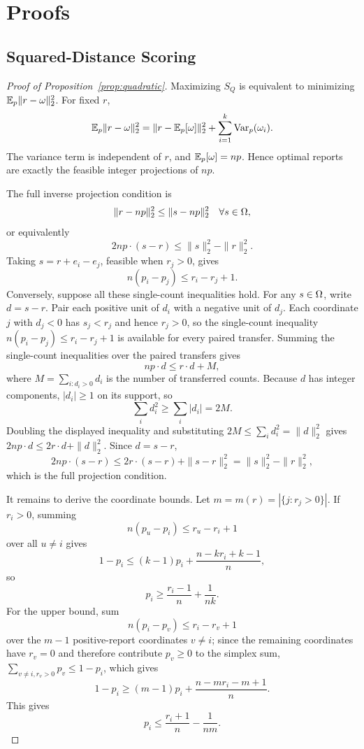 \appendix

\section{Proofs}

\subsection{Squared-Distance Scoring}
\label{app:squared-proof}

\begin{proof}[Proof of Proposition~\ref{prop:quadratic}]
Maximizing \(S_Q\) is equivalent to minimizing \(\mathbb{E}_p\|r-\omega\|_2^2\).
For fixed \(r\),
\[
\mathbb{E}_p\|r-\omega\|_2^2
=
\|r-\mathbb{E}_p[\omega]\|_2^2
+
\sum_{i=1}^k\mathrm{Var}_p(\omega_i).
\]
The variance term is independent of \(r\), and \(\mathbb{E}_p[\omega]=np\).
Hence optimal reports are exactly the feasible integer projections of \(np\).

The full inverse projection condition is
\[
\|r-np\|_2^2\le \|s-np\|_2^2
\quad
\forall s\in\Omega,
\]
or equivalently
\[
2np\cdot(s-r)\le \|s\|_2^2-\|r\|_2^2.
\]
Taking \(s=r+e_i-e_j\), feasible when \(r_j>0\), gives
\[
n(p_i-p_j)\le r_i-r_j+1.
\]
Conversely, suppose all these single-count inequalities hold.
For any \(s\in\Omega\), write \(d=s-r\).
Pair each positive unit of \(d_i\) with a negative unit of \(d_j\).
Each coordinate \(j\) with \(d_j<0\) has \(s_j<r_j\) and hence \(r_j>0\), so the single-count inequality \(n(p_i-p_j)\le r_i-r_j+1\) is available for every paired transfer.
Summing the single-count inequalities over the paired transfers gives
\[
np\cdot d\le r\cdot d+M,
\]
where \(M=\sum_{i:d_i>0}d_i\) is the number of transferred counts.
Because \(d\) has integer components, \(|d_i|\ge 1\) on its support, so
\[
\sum_i d_i^2\ge\sum_i |d_i|=2M.
\]
Doubling the displayed inequality and substituting \(2M\le\sum_i d_i^2=\|d\|_2^2\) gives \(2np\cdot d\le 2r\cdot d+\|d\|_2^2\).
Since \(d=s-r\),
\[
2np\cdot(s-r)
\le
2r\cdot(s-r)+\|s-r\|_2^2
=
\|s\|_2^2-\|r\|_2^2,
\]
which is the full projection condition.

It remains to derive the coordinate bounds.
Let \(m=m(r)=|\{j:r_j>0\}|\).
If \(r_i>0\), summing
\[
n(p_u-p_i)\le r_u-r_i+1
\]
over all \(u\ne i\) gives
\[
1-p_i\le (k-1)p_i+\frac{n-kr_i+k-1}{n},
\]
so
\[
p_i\ge \frac{r_i-1}{n}+\frac{1}{nk}.
\]
For the upper bound, sum
\[
n(p_i-p_v)\le r_i-r_v+1
\]
over the \(m-1\) positive-report coordinates \(v\ne i\); since the remaining coordinates have \(r_v=0\) and therefore contribute \(p_v\ge 0\) to the simplex sum, \(\sum_{v\ne i, r_v>0}p_v\le 1-p_i\), which gives
\[
1-p_i\ge (m-1)p_i+\frac{n-mr_i-m+1}{n}.
\]
This gives
\[
p_i\le \frac{r_i+1}{n}-\frac{1}{nm}.
\]


\end{proof}
